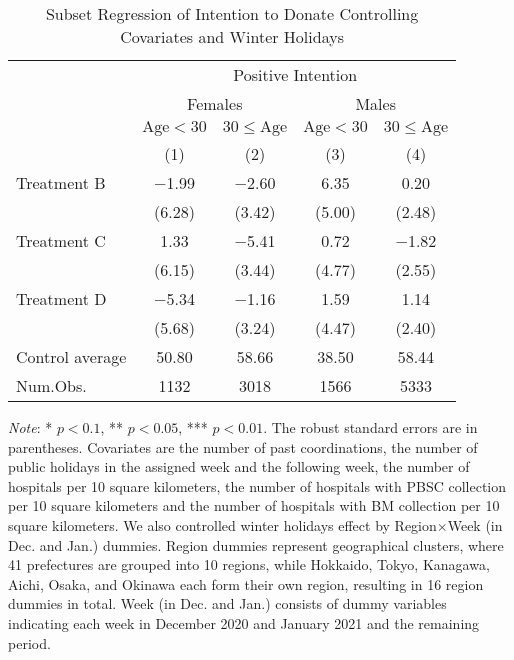 \documentclass[12pt, a4paper]{article}
\begin{document}
\begin{table}[H]

\caption{\label{tab:int-lm-subset3}Subset Regression of Intention to Donate Controlling Covariates and Winter Holidays}
\centering
\fontsize{8}{10}\selectfont
\begin{threeparttable}
\begin{tabular}[t]{lcccc}
\toprule
\multicolumn{1}{c}{ } & \multicolumn{4}{c}{Positive Intention} \\
\cmidrule(l{3pt}r{3pt}){2-5}
\multicolumn{1}{c}{ } & \multicolumn{2}{c}{Females} & \multicolumn{2}{c}{Males} \\
\cmidrule(l{3pt}r{3pt}){2-3} \cmidrule(l{3pt}r{3pt}){4-5}
\multicolumn{1}{c}{ } & \multicolumn{1}{c}{$\text{Age} < 30$} & \multicolumn{1}{c}{$30 \le \text{Age}$} & \multicolumn{1}{c}{$\text{Age} < 30$} & \multicolumn{1}{c}{$30 \le \text{Age}$} \\
\cmidrule(l{3pt}r{3pt}){2-2} \cmidrule(l{3pt}r{3pt}){3-3} \cmidrule(l{3pt}r{3pt}){4-4} \cmidrule(l{3pt}r{3pt}){5-5}
  & (1) & (2) & (3) & (4)\\
\midrule
Treatment B & \num{-1.99} & \num{-2.60} & \num{6.35} & \num{0.20}\\
 & (\num{6.28}) & (\num{3.42}) & (\num{5.00}) & (\num{2.48})\\
Treatment C & \num{1.33} & \num{-5.41} & \num{0.72} & \num{-1.82}\\
 & (\num{6.15}) & (\num{3.44}) & (\num{4.77}) & (\num{2.55})\\
Treatment D & \num{-5.34} & \num{-1.16} & \num{1.59} & \num{1.14}\\
 & (\num{5.68}) & (\num{3.24}) & (\num{4.47}) & (\num{2.40})\\
\midrule
Control average & 50.80 & 58.66 & 38.50 & 58.44\\
Num.Obs. & \num{1132} & \num{3018} & \num{1566} & \num{5333}\\
\bottomrule
\end{tabular}
\begin{tablenotes}
\item \emph{Note}: * $p < 0.1$, ** $p < 0.05$, *** $p < 0.01$. The robust standard errors are in parentheses. Covariates are the number of past coordinations, the number of public holidays in the assigned week and the following week, the number of hospitals per 10 square kilometers, the number of hospitals with PBSC collection per 10 square kilometers and the number of hospitals with BM collection per 10 square kilometers. We also controlled winter holidays effect by Region$\times$Week (in Dec. and Jan.) dummies. Region dummies represent geographical clusters, where 41 prefectures are grouped into 10 regions, while Hokkaido, Tokyo, Kanagawa, Aichi, Osaka, and Okinawa each form their own region, resulting in 16 region dummies in total. Week (in Dec. and Jan.) consists of dummy variables indicating each week in December 2020 and January 2021 and the remaining period.
\end{tablenotes}
\end{threeparttable}
\end{table}
\end{document}
